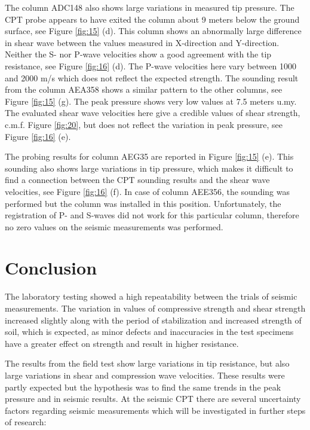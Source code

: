 \documentclass[final,3p,times,twocolumn]{elsarticle}
\begin{document}
The column ADC148 also shows large variations in measured tip pressure. The CPT probe appears to have exited the column about 9 meters below the ground surface, see Figure \ref{fig:15} (d). This column shows an abnormally large difference in shear wave between the values measured in X-direction and Y-direction. Neither the S- nor P-wave velocities show a good agreement with the tip resistance, see Figure \ref{fig:16} (d). The P-wave velocities here vary between 1000 and 2000 m/s which does not reflect the expected strength. The sounding result from the column AEA358 shows a similar pattern to the other columns, see Figure \ref{fig:15} (g). The peak pressure shows very low values at 7.5 meters u.my. The evaluated shear wave velocities here give a credible values of shear strength, c.m.f. Figure \ref{fig:20}, but does not reflect the variation in peak pressure, see Figure \ref{fig:16} (e).

The probing results for column AEG35 are reported in Figure \ref{fig:15} (e). This sounding also shows large variations in tip pressure, which makes it difficult to find a connection between the CPT sounding results and the shear wave velocities, see Figure \ref{fig:16} (f). In case of column AEE356, the sounding was performed but the column was installed in this position. Unfortunately, the registration of P- and S-waves did not work for this particular column, therefore no zero values on the seismic measurements was performed.

\section{Conclusion}

The laboratory testing showed a high repeatability between the trials of seismic measurements. The variation in values of compressive strength and shear strength increased slightly along with the period of stabilization and increased strength of soil, which is expected, as minor defects and inaccuracies in the test specimens have a greater effect on strength and result in higher resistance. 

The results from the field test show large variations in tip resistance, but also large variations in shear and compression wave velocities. These results were partly expected but the hypothesis was to find the same trends in the peak pressure and in seismic results. At the seismic CPT there are several uncertainty factors regarding seismic measurements which will be investigated in further steps of research:
\end{document}
